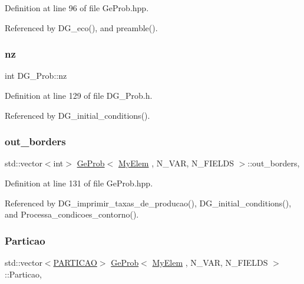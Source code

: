 Definition at line 96 of file Ge\+Prob.\+hpp.



Referenced by D\+G\+\_\+eco(), and preamble().

\mbox{\label{classDG__Prob_a18aa37594c06d6a879fad8d06f1950d1}} 
\subsubsection{\texorpdfstring{nz}{nz}}
{\footnotesize\ttfamily int D\+G\+\_\+\+Prob\+::nz\hspace{0.3cm}{\ttfamily [private]}}



Definition at line 129 of file D\+G\+\_\+\+Prob.\+h.



Referenced by D\+G\+\_\+initial\+\_\+conditions().

\mbox{\label{classGeProb_a2ac12ca16e62807fd3c69d97bf665336}} 
\subsubsection{\texorpdfstring{out\+\_\+borders}{out\_borders}}
{\footnotesize\ttfamily std\+::vector$<$int$>$ \hyperlink{classGeProb}{Ge\+Prob}$<$ \hyperlink{DG__Prob_8h_a83cd887ced9a6587428f267e50cd4787}{My\+Elem} , N\+\_\+\+V\+AR, N\+\_\+\+F\+I\+E\+L\+DS $>$\+::out\+\_\+borders\hspace{0.3cm}{\ttfamily [protected]}, {\ttfamily [inherited]}}



Definition at line 131 of file Ge\+Prob.\+hpp.



Referenced by D\+G\+\_\+imprimir\+\_\+taxas\+\_\+de\+\_\+producao(), D\+G\+\_\+initial\+\_\+conditions(), and Processa\+\_\+condicoes\+\_\+contorno().

\mbox{\label{classGeProb_a39012a295f18016463a00946affc3818}} 
\subsubsection{\texorpdfstring{Particao}{Particao}}
{\footnotesize\ttfamily std\+::vector$<$\hyperlink{structPARTICAO}{P\+A\+R\+T\+I\+C\+AO}$>$ \hyperlink{classGeProb}{Ge\+Prob}$<$ \hyperlink{DG__Prob_8h_a83cd887ced9a6587428f267e50cd4787}{My\+Elem} , N\+\_\+\+V\+AR, N\+\_\+\+F\+I\+E\+L\+DS $>$\+::Particao\hspace{0.3cm}{\ttfamily [protected]}, {\ttfamily [inherited]}}



